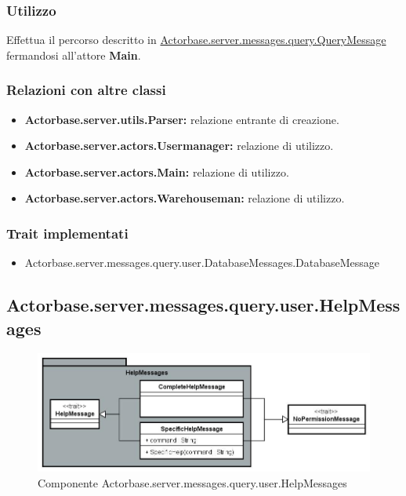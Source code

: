 \documentclass[a4paper]{article}
\begin{document}
			\subsubsection{Utilizzo}
				Effettua il percorso descritto in \hyperref[QueryMessage]{Actorbase.server.messages.query.QueryMessage} fermandosi all'attore \textbf{Main}.
				
			\subsubsection{Relazioni con altre classi}
				\begin{itemize}
					\item \textbf{Actorbase.server.utils.Parser:} relazione entrante di creazione.
					\item \textbf{Actorbase.server.actors.Usermanager:} relazione di utilizzo.
					\item \textbf{Actorbase.server.actors.Main:} relazione di utilizzo.
					\item \textbf{Actorbase.server.actors.Warehouseman:} relazione di utilizzo.
				\end{itemize}
			\subsubsection{Trait implementati}
				\begin{itemize}
					\item Actorbase.server.messages.query.user.DatabaseMessages.DatabaseMessage
				\end{itemize}
				
		\subsection{Actorbase.server.messages.query.user.HelpMessages}
		
			\begin{figure}[H]
				\centering
				\includegraphics[width=\textwidth]{ST/Server/helpMessagesLevel.jpg}
				\caption{Componente Actorbase.server.messages.query.user.HelpMessages}
			\end{figure}
			
\end{document}
